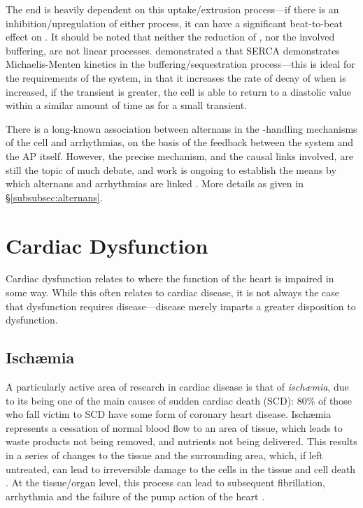 \documentclass[../thesis-main.tex]{subfiles}
\begin{document}
The end \cadia{} is heavily dependent on this uptake/extrusion process---if there is an inhibition/up\-regulation of either process, it can have a significant beat-to-beat effect on \cadia{}. It should be noted that neither the reduction of \cai{}, nor the involved buffering, are not linear processes. \citet{Bers1995} demonstrated a that SERCA demonstrates Michaelis-Menten kinetics in the buffering/sequestration process---this is ideal for the requirements of the system, in that it increases the rate of decay of \cai{} when \cai{} is increased, \idest{} if the \ca{} transient is greater, the cell is able to return \cai{} to a diastolic value within a similar amount of time as for a small transient.

There is a long-known association between alternans in the \ca{}-handling mechanisms of the cell and arrhythmias, on the basis of the feedback between the \ca{} system and the AP itself. However, the precise mechanism, and the causal links involved, are still the topic of much debate, and work is ongoing to establish the means by which alternans and arrhythmias are linked \citep{Alvarez-Lacalle2013, Chen2009, Restrepo2008}. More details as given in \S\ref{subsubsec:alternans}.




\section{Cardiac Dysfunction}
\label{sec:dysfunction}
Cardiac dysfunction relates to where the function of the heart is impaired in some way. While this often relates to cardiac disease, it is not always the case that dysfunction requires disease---disease merely imparts a greater disposition to dysfunction.

\subsection{Isch\ae{}mia}
\label{subsec:ischaemia}
A particularly active area of research in cardiac disease is that of \emph{isch\ae{}mia}, due to its being one of the main causes of sudden cardiac death (SCD): $80\%$ of those who fall victim to SCD have some form of coronary heart disease. Isch\ae{}mia represents a cessation of normal blood flow to an area of tissue, which leads to waste products not being removed, and nutrients not being delivered. This results in a series of changes to the tissue and the surrounding area, which, if left untreated, can lead to irreversible damage to the cells in the tissue and cell death \citep{Carmeliet1999}. At the tissue/organ level, this process can lead to subsequent fibrillation, arrhythmia and the failure of the pump action of the heart \citep{Harris1954}.
\end{document}
